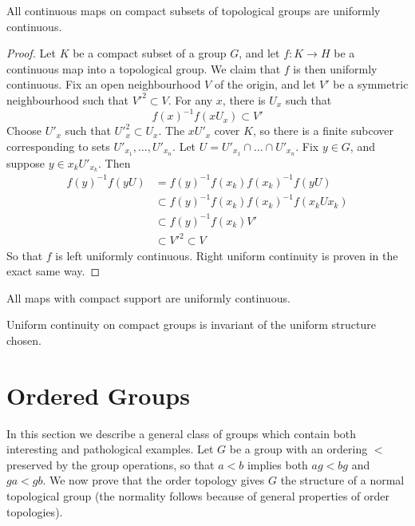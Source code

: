 \begin{theorem}
    All continuous maps on compact subsets of topological groups are uniformly continuous.
\end{theorem}
\begin{proof}
    Let $K$ be a compact subset of a group $G$, and let $f:K \to H$ be a continuous map into a topological group. We claim that $f$ is then uniformly continuous. Fix an open neighbourhood $V$ of the origin, and let $V'$ be a symmetric neighbourhood such that $V'^2 \subset V$. For any $x$, there is $U_x$ such that
    \[ f(x)^{-1} f(xU_x) \subset V' \]
    Choose $U'_x$ such that $U'^2_x \subset U_x$. The $xU'_x$ cover $K$, so there is a finite subcover corresponding to sets $U'_{x_1}, \dots, U'_{x_n}$. Let $U = U'_{x_1} \cap \dots \cap U'_{x_n}$. Fix $y \in G$, and suppose $y \in x_k U'_{x_k}$. Then
    \begin{align*}
        f(y)^{-1} f(yU) &= f(y)^{-1} f(x_k) f(x_k)^{-1} f(yU)\\
        &\subset f(y)^{-1} f(x_k) f(x_k)^{-1} f(x_k Ux_k)\\
        &\subset f(y)^{-1} f(x_k) V'\\
        &\subset V'^2 \subset V
    \end{align*}
    So that $f$ is left uniformly continuous. Right uniform continuity is proven in the exact same way.
\end{proof}

\begin{corollary}
    All maps with compact support are uniformly continuous.
\end{corollary}

\begin{corollary}
    Uniform continuity on compact groups is invariant of the uniform structure chosen.
\end{corollary}

\section{Ordered Groups}

In this section we describe a general class of groups which contain both interesting and pathological examples. Let $G$ be a group with an ordering $<$ preserved by the group operations, so that $a < b$ implies both $ag < bg$ and $ga < gb$. We now prove that the order topology gives $G$ the structure of a normal topological group (the normality follows because of general properties of order topologies).


